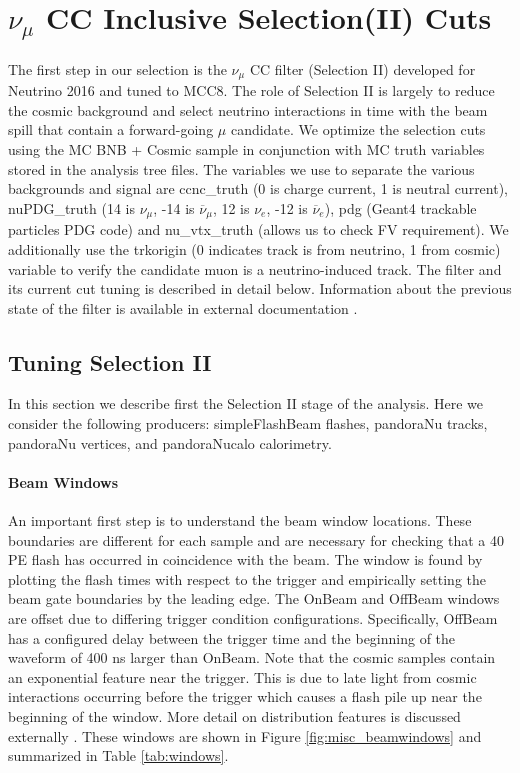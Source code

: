 \documentclass{article}
\begin{document}
\clearpage
\section{ $\nu_{\mu}$ CC Inclusive Selection(II) Cuts }
\par The first step in our selection is the $\nu_\mu$ CC filter (Selection II) developed for Neutrino 2016 and tuned to MCC8. The role of Selection II is largely to reduce the cosmic background and select neutrino interactions in time with the beam spill that contain a forward-going $\mu$ candidate.  We optimize the selection cuts using the MC BNB + Cosmic sample in conjunction with MC truth variables stored in the analysis tree files. The variables we use to separate the various backgrounds and signal are ccnc\_truth (0 is charge current, 1 is neutral current), nuPDG\_truth (14 is $\nu_{\mu}$, -14 is $\overline{\nu}_\mu$, 12 is $\nu_e$, -12 is $\overline{\nu}_e$), pdg (Geant4 trackable particles PDG code) and nu\_vtx\_truth (allows us to check FV requirement). We additionally use the trkorigin (0 indicates track is from neutrino, 1 from cosmic) variable to verify the candidate muon is a neutrino-induced track. The filter and its current cut tuning is described in detail below. Information about the previous state of the filter is available in external documentation \cite{bib:numucc} \cite{bib:6172}. 



\subsection{Tuning Selection II}
In this section we describe first the Selection II stage of the analysis.  Here we consider the following producers: simpleFlashBeam flashes, pandoraNu tracks, pandoraNu vertices, and pandoraNucalo calorimetry.

\noindent \paragraph{Beam Windows} An important first step is to understand the beam window locations. These boundaries are different for each sample and are necessary for checking that a 40 PE flash has occurred in coincidence with the beam. The window is found by plotting the flash times with respect to the trigger and empirically setting the beam gate boundaries by the leading edge. The OnBeam and OffBeam windows are offset due to differing trigger condition configurations. Specifically, OffBeam has a configured delay between the trigger time and the beginning of the waveform of 400 ns larger than OnBeam. Note that the cosmic samples contain an exponential feature near the trigger. This is due to late light from cosmic interactions occurring before the trigger which causes a flash pile up near the beginning of the window. More detail on distribution features is discussed externally \cite{bib:davidcpot}. These windows are shown in Figure \ref{fig:misc_beamwindows} and summarized in Table \ref{tab:windows}.
\end{document}
